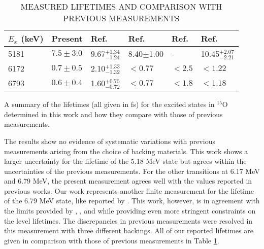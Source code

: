 \begin{table}[]
\caption{MEASURED LIFETIMES AND COMPARISON WITH PREVIOUS MEASUREMENTS}
\begin{center}
\begin{threeparttable}
\begin{tabular}{llllll}
\toprule
$E_{x}$ (keV) & Present       & Ref. \cite{Bertone2001}  & Ref. \cite{Schurmann2008} & Ref. \cite{Galinski2014} & Ref. \cite{Sharma2020} \\
\midrule
5181          & $7.5 \pm 3.0$ & 9.67$^{+1.34}_{-1.24}$ & 8.40$\pm$1.00            & -  & 10.45$^{+2.07}_{-2.21}$                      \\
6172          & $0.7 \pm 0.5$ & 2.10$^{+1.33}_{-1.32}$  & $< 0.77$                 & $< 2.5$   & $< 1.22$              \\
6793          & $0.6 \pm 0.4$ & 1.60$^{+0.75}_{-0.72}$  & $< 0.77$                 & $< 1.8$  & $< 1.18$       \\ \bottomrule
\end{tabular}
\begin{tablenotes}
\small 
\item A summary of the lifetimes (all given in fs) for the excited states in $^{15}$O determined in this work and how they compare with those of previous measurements. 
\end{tablenotes}
\end{threeparttable}
\label{table: lifetimesConclusion}
\end{center}
\end{table}

The results show no evidence of systematic variations with previous measurements arising from the choice of backing materials. This work shows a larger uncertainty for the lifetime of the 5.18 MeV state but agrees within the uncertainties of the previous measurements. For the other transitions at 6.17 MeV and 6.79 MeV, the present measurement agrees well with the values reported in previous works. Our work represents another finite measurement for the lifetime of the 6.79 MeV state, like reported by \citet{Bertone2001}. This work, however, is in agreement with the limits provided by \citet{Schurmann2008}, \citet{Galinski2014}, and \citet{Sharma2020} while providing even more stringent constraints on the level lifetimes. The discrepancies in previous measurements were resolved in this measurement with three different backings. All of our reported lifetimes are given in comparison with those of previous measurements in Table \ref{table: lifetimesConclusion}.


